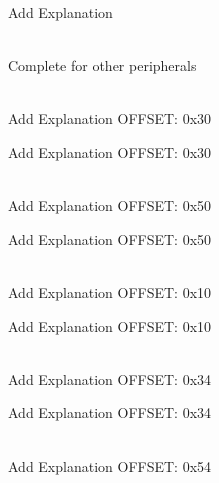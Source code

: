 \begin{DoxyRefList}
\label{todo__todo000070}%
%
Add Explanation  
\item[{\parbox[t]{\linewidth}{Module \doxylink{group___r_c_c___a_p_b1___peripheral___reset}{RCC\+\_\+\+APB1\+\_\+\+Peripheral\+\_\+\+Reset} }}]\hfill \\
\label{todo__todo000010}%
%
Complete for other peripherals  
\item[{\parbox[t]{\linewidth}{Member \doxylink{struct_r_c_c___reg_def__t_aea53adc2e7c545775fa04ad34f5f9ff9}{RCC\+\_\+\+Reg\+Def\+\_\+t\+::AHB1\+ENR} }}]\hfill \\
\label{todo__todo000033}%
%
Add Explanation OFFSET\+: 0x30 

\label{todo__todo000103}%
%
Add Explanation OFFSET\+: 0x30  
\item[{\parbox[t]{\linewidth}{Member \doxylink{struct_r_c_c___reg_def__t_a0f1e1666ec1c7f05d30ba69d4cdb2357}{RCC\+\_\+\+Reg\+Def\+\_\+t\+::AHB1\+LPENR} }}]\hfill \\
\label{todo__todo000041}%
%
Add Explanation OFFSET\+: 0x50 

\label{todo__todo000111}%
%
Add Explanation OFFSET\+: 0x50  
\item[{\parbox[t]{\linewidth}{Member \doxylink{struct_r_c_c___reg_def__t_a42bb18f1c2aadd637775946da38fea41}{RCC\+\_\+\+Reg\+Def\+\_\+t\+::AHB1\+RSTR} }}]\hfill \\
\label{todo__todo000025}%
%
Add Explanation OFFSET\+: 0x10 

\label{todo__todo000095}%
%
Add Explanation OFFSET\+: 0x10  
\item[{\parbox[t]{\linewidth}{Member \doxylink{struct_r_c_c___reg_def__t_abaf4c083bc159c5148cc9db38ac7388a}{RCC\+\_\+\+Reg\+Def\+\_\+t\+::AHB2\+ENR} }}]\hfill \\
\label{todo__todo000034}%
%
Add Explanation OFFSET\+: 0x34 

\label{todo__todo000104}%
%
Add Explanation OFFSET\+: 0x34  
\item[{\parbox[t]{\linewidth}{Member \doxylink{struct_r_c_c___reg_def__t_a8c6a99540a64f563956bef7dfc501a51}{RCC\+\_\+\+Reg\+Def\+\_\+t\+::AHB2\+LPENR} }}]\hfill \\
\label{todo__todo000042}%
%
Add Explanation OFFSET\+: 0x54 


\end{DoxyRefList}

